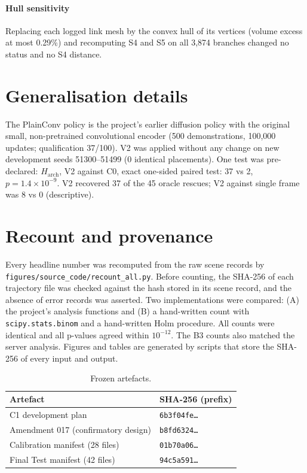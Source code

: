 \documentclass[preprint,12pt]{elsarticle}
\begin{document}
\paragraph{Hull sensitivity} Replacing each logged link mesh by the convex hull of its vertices (volume excess at most 0.29\%) and recomputing S4 and S5 on all 3,874 branches changed no status and no S4 distance.

\section{Generalisation details}\label{sec:s-gen}

The PlainConv policy is the project's earlier diffusion policy with the original small, non-pretrained convolutional encoder (500 demonstrations, 100,000 updates; qualification 37/100). V2 was applied without any change on new development seeds 51300--51499 (0 identical placements). One test was pre-declared: $H_{\mathrm{arch}}$, V2 against C0, exact one-sided paired test: 37 vs 2, $p=1.4\times10^{-9}$. V2 recovered 37 of the 45 oracle rescues; V2 against single frame was 8 vs 0 (descriptive).

\section{Recount and provenance}\label{sec:s-recount}

Every headline number was recomputed from the raw scene records by \texttt{figures/source\_code/recount\_all.py}. Before counting, the SHA-256 of each trajectory file was checked against the hash stored in its scene record, and the absence of error records was asserted. Two implementations were compared: (A) the project's analysis functions and (B) a hand-written count with \texttt{scipy.stats.binom} and a hand-written Holm procedure. All counts were identical and all p-values agreed within $10^{-12}$. The B3 counts also matched the server analysis. Figures and tables are generated by scripts that store the SHA-256 of every input and output.

\begin{table}[!htbp]
\centering\footnotesize
\caption{Frozen artefacts.}\label{tab:s-hash}
\begin{tabular}{ll}
\toprule
Artefact & SHA-256 (prefix)\\
\midrule
C1 development plan & \texttt{6b3f04fe\ldots}\\
Amendment 017 (confirmatory design) & \texttt{b8fd6324\ldots}\\
Calibration manifest (28 files) & \texttt{01b70a06\ldots}\\
Final Test manifest (42 files) & \texttt{94c5a591\ldots}\\
\bottomrule
\end{tabular}
\end{table}
\end{document}
